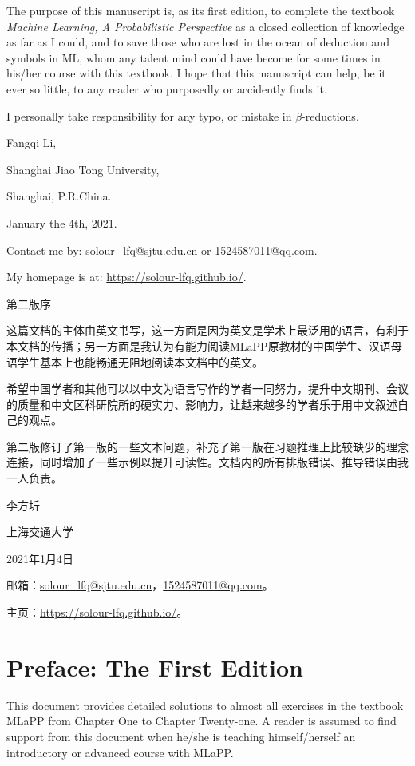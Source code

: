 \documentclass[UTF8]{ctexart}
\begin{document}
The purpose of this manuscript is, as its first edition, to complete the textbook \emph{Machine Learning, A Probabilistic Perspective} as a closed collection of knowledge as far as I could, and to save those who are lost in the ocean of deduction and symbols in ML, whom any talent mind could have become for some times in his/her course with this textbook. 
I hope that this manuscript can help, be it ever so little, to any reader who purposedly or accidently finds it. 

I personally take responsibility for any typo, or mistake in $\beta$-reductions. 

Fangqi Li,

Shanghai Jiao Tong University,

Shanghai, P.R.China.

January the 4th, 2021.

Contact me by: \url{solour_lfq@sjtu.edu.cn} or \url{1524587011@qq.com}.

My homepage is at: \url{https://solour-lfq.github.io/}.

\newpage
\centerline{\Large{第二版序}}

这篇文档的主体由英文书写，这一方面是因为英文是学术上最泛用的语言，有利于本文档的传播；另一方面是我认为有能力阅读MLaPP原教材的中国学生、汉语母语学生基本上也能畅通无阻地阅读本文档中的英文。

希望中国学者和其他可以以中文为语言写作的学者一同努力，提升中文期刊、会议的质量和中文区科研院所的硬实力、影响力，让越来越多的学者乐于用中文叙述自己的观点。

第二版修订了第一版的一些文本问题，补充了第一版在习题推理上比较缺少的理念连接，同时增加了一些示例以提升可读性。文档内的所有排版错误、推导错误由我一人负责。

李方圻

上海交通大学

2021年1月4日

邮箱：\url{solour_lfq@sjtu.edu.cn}，\url{1524587011@qq.com}。

主页：\url{https://solour-lfq.github.io/}。

\newpage
\section{Preface: The First Edition}
This document provides detailed solutions to almost all exercises in the textbook MLaPP from Chapter One to Chapter Twenty-one. 
A reader is assumed to find support from this document when he/she is teaching himself/herself an introductory or advanced course with MLaPP. 
\end{document}
